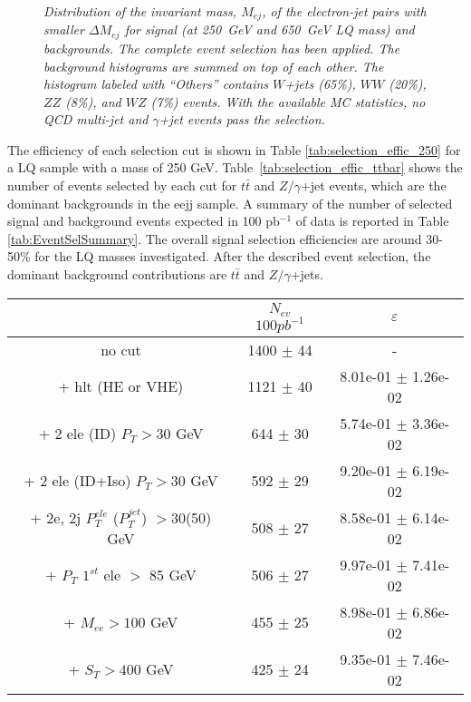 \documentclass{cmspaper}
\begin{document}
\begin{linenumbers}
\begin{figure}[htbp]
  \begin{center}
    \caption{\small \sl Distribution of the invariant mass, $M_{ej}$, of the electron-jet pairs 
      with smaller $\Delta M_{ej}$
      for signal (at 250~GeV and 650~GeV LQ mass) and backgrounds. 
      The complete event selection has been applied.
      The background histograms are summed on top of each other.
      The histogram labeled with ``Others'' contains $W$+jets (65\%), 
      $WW$ (20\%), $ZZ$ (8\%), and $WZ$ (7\%) events. 
      With the available MC statistics, no QCD multi-jet and $\gamma$+jet events pass 
      the selection.}
    \label{fig:Mej_allComb}
  \end{center}
\end{figure}

The efficiency of each selection cut is shown in Table \ref{tab:selection_effic_250} 
for a LQ sample with a mass of 250 GeV.  
Table~\ref{tab:selection_effic_ttbar} shows the number of events selected by each cut 
for $t\bar{t}$ and $Z/\gamma$+jet events, which are the dominant backgrounds in the eejj sample. 
A summary of the number of selected signal and background events expected in 100 pb$^{-1}$ of data 
is reported in Table \ref{tab:EventSelSummary}. 
The overall signal selection efficiencies 
are around 30-50\% for the LQ masses investigated. 
After the described event selection, the dominant background 
contributions are $t\bar{t}$ and $Z/\gamma$+jets. 

\begin{table}[htbp]
\begin{center}
\begin{tabular}{|c|c|c|}
\hline
\hline
 & $N_{ev}$ $100pb^{-1}$ & $\varepsilon$ \\
\hline
\hline

no cut &1400 $\pm$ 44& - \\
+ hlt (HE or VHE) &1121 $\pm$ 40 & 8.01e-01 $\pm$ 1.26e-02\\
+ 2 ele (ID) $P_{T} >30$ GeV &644 $\pm$ 30 & 5.74e-01 $\pm$ 3.36e-02\\
+ 2 ele (ID+Iso) $P_{T} >30$ GeV &592 $\pm$ 29 & 9.20e-01 $\pm$ 6.19e-02\\
+ 2e, 2j $P_{T}^{ele}$ ($P_{T}^{jet}$) $>$30(50) GeV &508 $\pm$ 27& 8.58e-01 $\pm$ 6.14e-02\\
+ $P_{T}$ $1^{st}$ ele $>$ 85 GeV &506 $\pm$ 27& 9.97e-01 $\pm$ 7.41e-02\\
+ $M_{ee} >100$ GeV& 455 $\pm$ 25& 8.98e-01 $\pm$ 6.86e-02\\
+ $S_{T} >400$ GeV &425 $\pm$ 24& 9.35e-01 $\pm$ 7.46e-02\\
\hline


\end{tabular}
\end{center}
\end{table}
\end{linenumbers}
\end{document}
